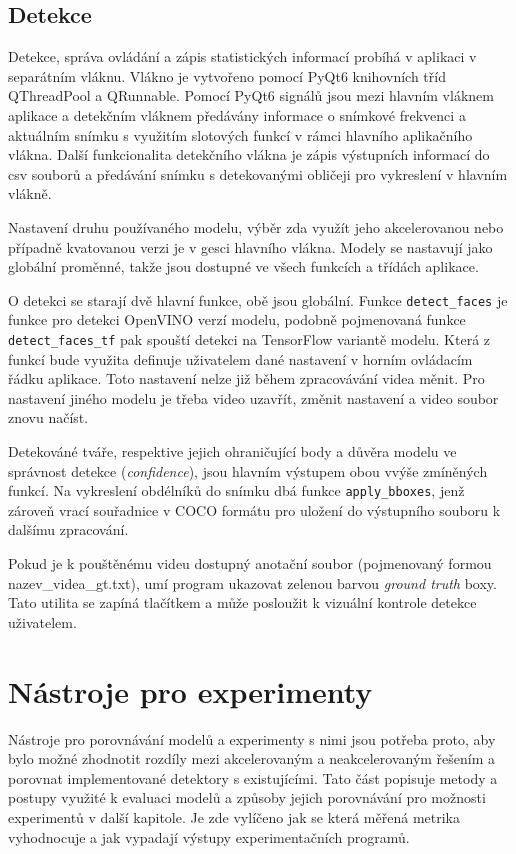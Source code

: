 \subsection*{Detekce}
Detekce, správa ovládání a zápis statistických informací probíhá v aplikaci v separátním vláknu. Vlákno je vytvořeno pomocí PyQt6 knihovních tříd QThreadPool a QRunnable. Pomocí PyQt6 signálů jsou mezi hlavním vláknem aplikace a detekčním vláknem předávány informace o snímkové frekvenci a aktuálním snímku s využitím slotových funkcí v rámci hlavního aplikačního vlákna. Další funkcionalita detekčního vlákna je zápis výstupních informací do csv souborů a předávání snímku s detekovanými obličeji pro vykreslení v hlavním vlákně.

Nastavení druhu používaného modelu, výběr zda využít jeho akcelerovanou nebo případně kvatovanou verzi je v gesci hlavního vlákna. Modely se nastavují jako globální proměnné, takže jsou dostupné ve všech funkcích a třídách aplikace.

O detekci se starají dvě hlavní funkce, obě jsou globální. Funkce \texttt{detect\_faces} je funkce pro detekci OpenVINO verzí modelu, podobně pojmenovaná funkce \texttt{detect\_faces\_tf} pak spouští detekci na TensorFlow variantě modelu. Která z funkcí bude využita definuje uživatelem dané nastavení v horním ovládacím řádku aplikace. Toto nastavení nelze již během zpracovávání videa měnit. Pro nastavení jiného modelu je třeba video uzavřít, změnit nastavení a video soubor znovu načíst.

Detekováné tváře, respektive jejich ohraničující body a důvěra modelu ve správnost detekce (\emph{confidence}), jsou hlavním výstupem obou vvýše zmíněných funkcí. Na vykreslení obdélníků do snímku dbá funkce \texttt{apply\_bboxes}, jenž zároveň vrací souřadnice v COCO formátu pro uložení do výstupního souboru k dalšímu zpracování.

Pokud je k pouštěnému videu dostupný anotační soubor (pojmenovaný formou nazev\_videa\_gt.txt), umí program ukazovat zelenou barvou \emph{ground truth} boxy. Tato utilita se zapíná tlačítkem  a může posloužit k vizuální kontrole detekce uživatelem.

\section{Nástroje pro experimenty}
\label{sekce:nastroje_pro_experimenty}
Nástroje pro porovnávání modelů a experimenty s nimi jsou potřeba proto, aby bylo možné zhodnotit rozdíly mezi akcelerovaným a neakcelerovaným řešením a porovnat implementované detektory s existujícími.
Tato část popisuje metody a postupy využité k evaluaci modelů 
a způsoby jejich porovnávání pro možnosti experimentů v další kapitole. Je zde vylíčeno jak se která měřená metrika vyhodnocuje a jak vypadají výstupy experimentačních programů.


